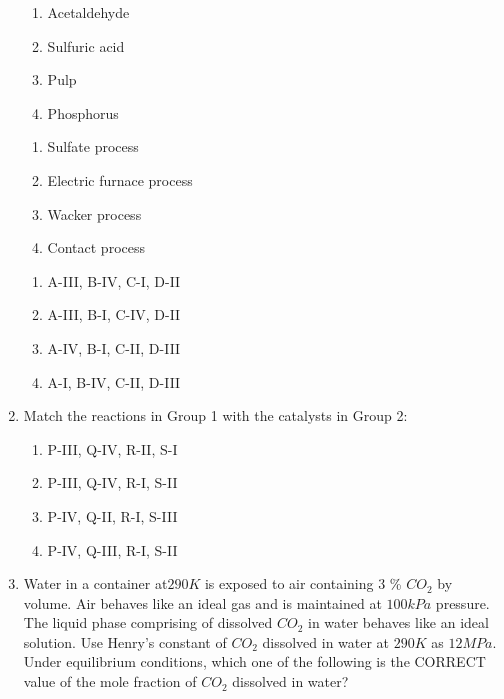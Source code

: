 \documentclass[journal,12pt,onecolumn]{IEEEtran}
\theoremstyle{remark}
\begin{document}
\begin{enumerate}
    \hfill{}
    \begin{multicols}{2}
    \begin{enumerate}[label=\Alph*]
        \item Acetaldehyde
        \item Sulfuric acid
        \item Pulp
        \item Phosphorus
    \end{enumerate}
    \columnbreak
    \begin{enumerate}[label=\Roman*]
        \item Sulfate process
        \item Electric furnace process
        \item Wacker process
        \item Contact process
    \end{enumerate}
    \end{multicols}
    \begin{enumerate}
        \item A-III, B-IV, C-I, D-II
        \item A-III, B-I, C-IV, D-II
        \item A-IV, B-I, C-II, D-III
        \item A-I, B-IV, C-II, D-III
    \end{enumerate}
\newpage
    \item Match the reactions in Group 1 with the catalysts in Group 2:

    \hfill{}
    
    \begin{enumerate}
        \item P-III, Q-IV, R-II, S-I
        \item P-III, Q-IV, R-I, S-II
        \item P-IV, Q-II, R-I, S-III
        \item P-IV, Q-III, R-I, S-II
    \end{enumerate}

    \item Water in a container at$290 K$ is exposed to air containing 3 \% $CO_2$ by volume. Air behaves like an ideal gas and is maintained at $100 kPa$ pressure. The liquid phase comprising of dissolved $CO_2$ in water behaves like an ideal solution. Use Henry’s constant of $CO_2$ dissolved in water at $290 K$ as $12 MPa$. Under equilibrium conditions, which one of the following is the CORRECT value of the mole fraction of $CO_2$ dissolved in water?


\end{enumerate}
\end{document}
